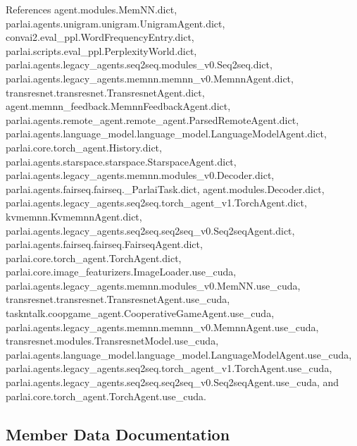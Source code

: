 References agent.\+modules.\+Mem\+N\+N.\+dict, parlai.\+agents.\+unigram.\+unigram.\+Unigram\+Agent.\+dict, convai2.\+eval\+\_\+ppl.\+Word\+Frequency\+Entry.\+dict, parlai.\+scripts.\+eval\+\_\+ppl.\+Perplexity\+World.\+dict, parlai.\+agents.\+legacy\+\_\+agents.\+seq2seq.\+modules\+\_\+v0.\+Seq2seq.\+dict, parlai.\+agents.\+legacy\+\_\+agents.\+memnn.\+memnn\+\_\+v0.\+Memnn\+Agent.\+dict, transresnet.\+transresnet.\+Transresnet\+Agent.\+dict, agent.\+memnn\+\_\+feedback.\+Memnn\+Feedback\+Agent.\+dict, parlai.\+agents.\+remote\+\_\+agent.\+remote\+\_\+agent.\+Parsed\+Remote\+Agent.\+dict, parlai.\+agents.\+language\+\_\+model.\+language\+\_\+model.\+Language\+Model\+Agent.\+dict, parlai.\+core.\+torch\+\_\+agent.\+History.\+dict, parlai.\+agents.\+starspace.\+starspace.\+Starspace\+Agent.\+dict, parlai.\+agents.\+legacy\+\_\+agents.\+memnn.\+modules\+\_\+v0.\+Decoder.\+dict, parlai.\+agents.\+fairseq.\+fairseq.\+\_\+\+Parlai\+Task.\+dict, agent.\+modules.\+Decoder.\+dict, parlai.\+agents.\+legacy\+\_\+agents.\+seq2seq.\+torch\+\_\+agent\+\_\+v1.\+Torch\+Agent.\+dict, kvmemnn.\+Kvmemnn\+Agent.\+dict, parlai.\+agents.\+legacy\+\_\+agents.\+seq2seq.\+seq2seq\+\_\+v0.\+Seq2seq\+Agent.\+dict, parlai.\+agents.\+fairseq.\+fairseq.\+Fairseq\+Agent.\+dict, parlai.\+core.\+torch\+\_\+agent.\+Torch\+Agent.\+dict, parlai.\+core.\+image\+\_\+featurizers.\+Image\+Loader.\+use\+\_\+cuda, parlai.\+agents.\+legacy\+\_\+agents.\+memnn.\+modules\+\_\+v0.\+Mem\+N\+N.\+use\+\_\+cuda, transresnet.\+transresnet.\+Transresnet\+Agent.\+use\+\_\+cuda, taskntalk.\+coopgame\+\_\+agent.\+Cooperative\+Game\+Agent.\+use\+\_\+cuda, parlai.\+agents.\+legacy\+\_\+agents.\+memnn.\+memnn\+\_\+v0.\+Memnn\+Agent.\+use\+\_\+cuda, transresnet.\+modules.\+Transresnet\+Model.\+use\+\_\+cuda, parlai.\+agents.\+language\+\_\+model.\+language\+\_\+model.\+Language\+Model\+Agent.\+use\+\_\+cuda, parlai.\+agents.\+legacy\+\_\+agents.\+seq2seq.\+torch\+\_\+agent\+\_\+v1.\+Torch\+Agent.\+use\+\_\+cuda, parlai.\+agents.\+legacy\+\_\+agents.\+seq2seq.\+seq2seq\+\_\+v0.\+Seq2seq\+Agent.\+use\+\_\+cuda, and parlai.\+core.\+torch\+\_\+agent.\+Torch\+Agent.\+use\+\_\+cuda.



\subsection{Member Data Documentation}
\mbox{\label{classtaskntalk_1_1coopgame__agent_1_1CooperativeGameAgent_a22435d52361d12e68f01373d2a08e6b4}} 

